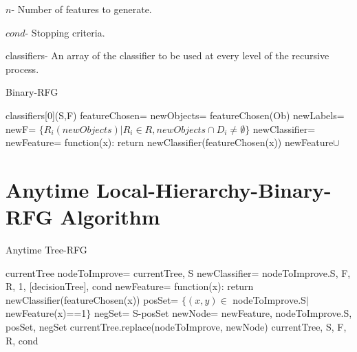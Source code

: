 \documentclass[12pt, a4paper]{article}
\theoremstyle{definition}
\begin{document}
\begin{appendices}
\begin{algorithm}[H]
$n$- Number of features to generate.

$cond$- Stopping criteria.

classifiers- An array of the classifier to be used at every level of the recursive process.

\caption{Binary-RFG}
\label{code2}
\begin{algorithmic}
    \State
    \Return classifiers[0](S,F)
\EndIf
\State featureChosen= 
\State newObjects= featureChosen(Ob)
\State newLabels= 
\State newF= $\{R_{i}(newObjects)|R_{i}\in R, newObjects\cap D_{i}\neq\emptyset\}$
\State newClassifier= 
\State newFeature= function(x): return newClassifier(featureChosen(x))
\State
\Return newFeature$\cup$ 
\EndFunction

\end{algorithmic}
\end{algorithm}

\section{Anytime Local-Hierarchy-Binary-RFG Algorithm} \label{app:3}
\begin{algorithm}[H]
\caption{Anytime Tree-RFG}
\label{code3}
\begin{algorithmic}
    \State
    \Return currentTree
\EndIf
\State nodeToImprove=  {currentTree, S}
\State newClassifier=  {nodeToImprove.S, F, R, 1, [decisionTree], cond}
\State newFeature= function(x): return newClassifier(featureChosen(x))
\State posSet= $\{(x,y)\in$ nodeToImprove.S$|$newFeature(x)==1$\}$
\State negSet= S-posSet
\State newNode=  {newFeature, nodeToImprove.S, posSet, negSet}
\State currentTree.replace(nodeToImprove, newNode)
\State
\Return {} {currentTree, S, F, R, cond}
\EndFunction

\end{algorithmic}
\end{algorithm}
\end{appendices}
\end{document}
